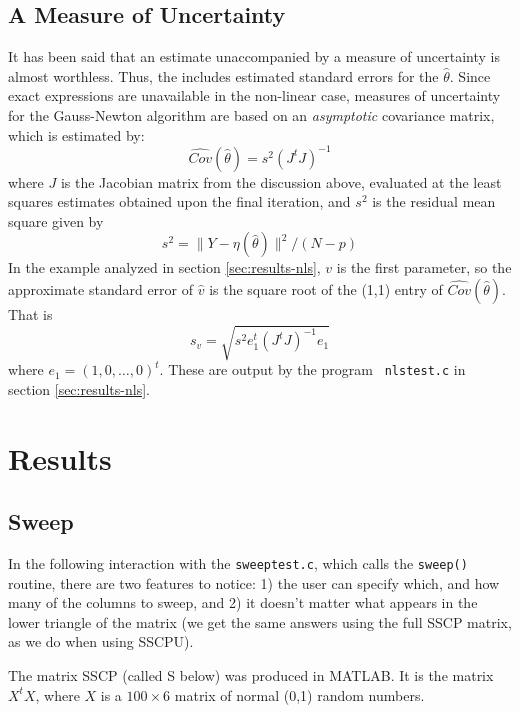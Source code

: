 \documentclass{article}
\begin{document}
\subsection{A Measure of Uncertainty}
It has been said that an estimate unaccompanied by a measure of uncertainty
is almost worthless.  Thus, the includes estimated standard
errors for the $\hat \theta$.  Since exact expressions are unavailable
in the non-linear case, measures of uncertainty for the Gauss-Newton algorithm
are based on an \emph{asymptotic} covariance matrix, which is estimated
by:
\[\widehat{Cov}(\hat \theta) = s^2(J^tJ)^{-1} \]
where $J$ is the Jacobian matrix from the discussion above, evaluated at the 
least squares estimates obtained upon the final iteration, 
and $s^2$ is the 
residual mean square given by 
\[ s^2 = \|Y - \eta(\hat \theta)\|^2/(N-p) \]
In the example analyzed in section \ref{sec:results-nls}, $v$ is the
first parameter, so the approximate standard error
of $\hat v$ is the square root of the (1,1) entry of $\widehat{Cov}(\hat \theta)$.
That is
\[s_v = \sqrt{s^2 e_1^t(J^tJ)^{-1}e_1} \]
where $e_1 = (1,0,\ldots,0)^t$.  These are output by the program {\tt
  nlstest.c} in section \ref{sec:results-nls}.

\section{Results}
\subsection{Sweep}
\label{sec:results-sweep}
In the following interaction with the {\tt sweeptest.c}, which calls the 
{\tt sweep()} routine, there are two features to notice: 1) the user
can specify which, and how many of the columns to sweep, and 2) it doesn't
matter what appears in the lower triangle of the matrix (we get the
same answers using the full SSCP matrix, as we do when using SSCPU).

The matrix SSCP (called S below) was produced in MATLAB.  It is the 
matrix $X^tX$, where $X$ is a $100 \times 6$ matrix of normal (0,1) 
random numbers.
\end{document}

